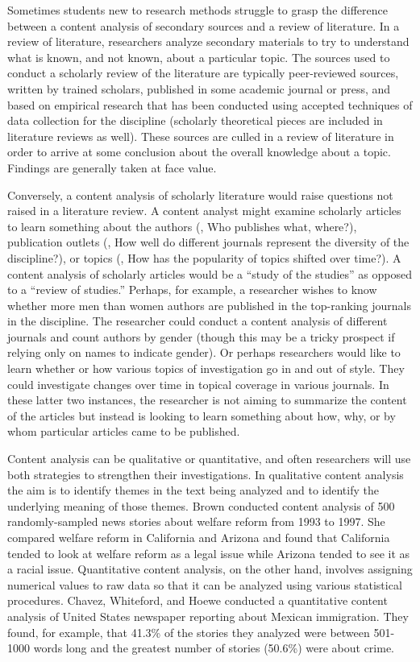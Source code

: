 Sometimes students new to research methods struggle to grasp the difference between a content analysis of secondary sources and a review of literature. In a review of literature, researchers analyze secondary materials to try to understand what is known, and not known, about a particular topic. The sources used to conduct a scholarly review of the literature are typically peer-reviewed sources, written by trained scholars, published in some academic journal or press, and based on empirical research that has been conducted using accepted techniques of data collection for the discipline (scholarly theoretical pieces are included in literature reviews as well). These sources are culled in a review of literature in order to arrive at some conclusion about the overall knowledge about a topic. Findings are generally taken at face value.

Conversely, a content analysis of scholarly literature would raise questions not raised in a literature review. A content analyst might examine scholarly articles to learn something about the authors (\eg, Who publishes what, where?), publication outlets (\eg, How well do different journals represent the diversity of the discipline?), or topics (\eg, How has the popularity of topics shifted over time?). A content analysis of scholarly articles would be a ``study of the studies'' as opposed to a ``review of studies.'' Perhaps, for example, a researcher wishes to know whether more men than women authors are published in the top-ranking journals in the discipline. The researcher could conduct a content analysis of different journals and count authors by gender (though this may be a tricky prospect if relying only on names to indicate gender). Or perhaps researchers would like to learn whether or how various topics of investigation go in and out of style. They could investigate changes over time in topical coverage in various journals. In these latter two instances, the researcher is not aiming to summarize the content of the articles but instead is looking to learn something about how, why, or by whom particular articles came to be published.

Content analysis can be qualitative or quantitative, and often researchers will use both strategies to strengthen their investigations. In qualitative content analysis the aim is to identify themes in the text being analyzed and to identify the underlying meaning of those themes. Brown\cite{brown2013race} conducted content analysis of 500 randomly-sampled news stories about welfare reform from 1993 to 1997. She compared welfare reform in California and Arizona and found that California tended to look at welfare reform as a legal issue while Arizona tended to see it as a racial issue. Quantitative content analysis, on the other hand, involves assigning numerical values to raw data so that it can be analyzed using various statistical procedures. Chavez, Whiteford, and Hoewe\cite{chavez2010reporting} conducted a quantitative content analysis of United States newspaper reporting about Mexican immigration. They found, for example, that 41.3\% of the stories they analyzed were between 501-1000 words long and the greatest number of stories (50.6\%) were about crime.

